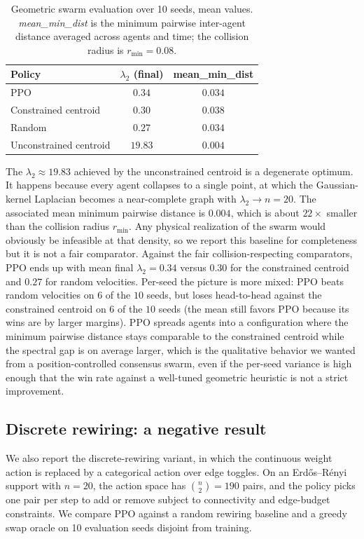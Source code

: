 \documentclass[letterpaper, 11 pt, journal, twoside]{IEEEtran}
\begin{document}
\begin{table}[t]
\centering
\caption{Geometric swarm evaluation over 10 seeds, mean values.
\emph{mean\_min\_dist} is the minimum pairwise inter-agent distance
averaged across agents and time; the collision radius is $r_{\min} = 0.08$.}
\label{tab:m3c}
\begin{tabular}{lcc}
\toprule
Policy & $\lambda_2$ (final) & mean\_min\_dist \\
\midrule
PPO                      & $0.34$  & $0.034$ \\
Constrained centroid     & $0.30$  & $0.038$ \\
Random                   & $0.27$  & $0.034$ \\
Unconstrained centroid   & $19.83$ & $0.004$ \\
\bottomrule
\end{tabular}
\end{table}

The $\lambda_2 \approx 19.83$ achieved by the unconstrained
centroid is a degenerate optimum. It happens because every agent
collapses to a single point, at which the Gaussian-kernel Laplacian
becomes a near-complete graph with $\lambda_2 \to n = 20$. The
associated mean minimum pairwise distance is $0.004$, which is
about $22\times$ smaller than the collision radius $r_{\min}$. Any
physical realization of the swarm would obviously be infeasible at
that density, so we report this baseline for completeness but it is
not a fair comparator. Against the fair collision-respecting
comparators, PPO ends up with mean final $\lambda_2 = 0.34$ versus
$0.30$ for the constrained centroid and $0.27$ for random
velocities. Per-seed the picture is more mixed: PPO beats random
velocities on $6$ of the $10$ seeds, but loses head-to-head against
the constrained centroid on $6$ of the $10$ seeds (the mean still
favors PPO because its wins are by larger margins). PPO spreads
agents into a configuration where the minimum pairwise distance
stays comparable to the constrained centroid while the spectral gap
is on average larger, which is the qualitative behavior we wanted
from a position-controlled consensus swarm, even if the per-seed
variance is high enough that the win rate against a well-tuned
geometric heuristic is not a strict improvement.

\subsection{Discrete rewiring: a negative result}
\label{sec:sim-m3a}
We also report the discrete-rewiring variant, in which the
continuous weight action is replaced by a categorical action over
edge toggles. On an Erd\H{o}s--R\'enyi support with $n = 20$, the
action space has $\binom{n}{2} = 190$ pairs, and the policy picks
one pair per step to add or remove subject to connectivity and
edge-budget constraints. We compare PPO against a random rewiring
baseline and a greedy swap oracle on 10 evaluation seeds disjoint
from training.
\end{document}
